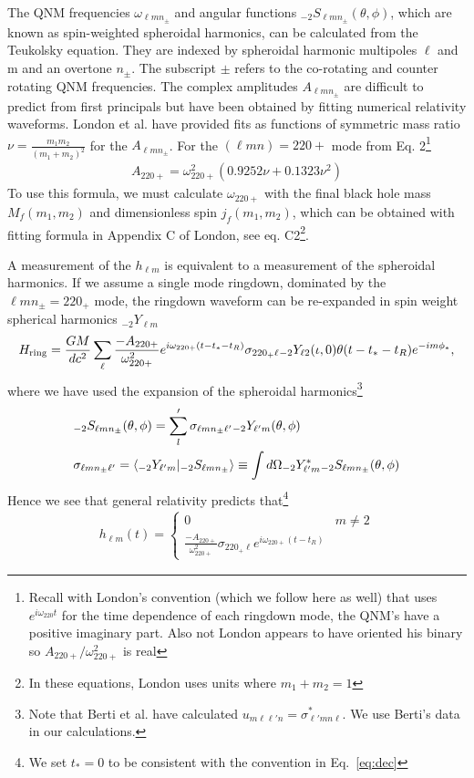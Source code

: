 \documentclass[aps,prd,amsmath,showpacs,amssymb,superscriptaddress,nofootinbib,longbibliography,eqsecnum,preprintnumbers]{revtex4-1}
\newcommand{\Sph}{{}_{-2}S_{\ell m n_{\pm}}}
\newcommand{\Ys}{{}_{-2}Y_{\ell m}}
\newcommand{\mul}{{\ell m n_{\pm}}}
\begin{document}
The QNM frequencies $\omega_\mul$ and angular functions $\Sph(\theta, \phi)$, which are known as spin-weighted spheroidal harmonics, can be calculated from the Teukolsky equation. They are indexed by spheroidal harmonic multipoles $\ell$ and m and an overtone $n_\pm$. The subscript $\pm$ refers to the co-rotating and counter rotating QNM frequencies. The complex amplitudes $A_\mul$ are difficult to predict from first principals but have been obtained by fitting numerical relativity waveforms. London et al. \cite{London:2014cma} have provided fits as functions of symmetric mass ratio $\nu=\frac{m_1m_2}{(m_1+m_2)^2}$ for the $A_{\ell m n_\pm}$. For the $(\ell m n) =220+$ mode from Eq. 2\footnote{Recall with London's convention (which we follow here as well) that uses $e^{i\omega_{220}t}$ for the time dependence of each ringdown mode, the QNM's have a positive imaginary part. Also not London appears to have oriented his binary so $A_{220+}/\omega_{220+}^2$ is real}
\begin{align}
A_{220+}=\omega_{220+}^2\left(0.9252 \nu +0.1323\nu^2 \right)
\label{eq:A220}
\end{align}
To use this formula, we must calculate $\omega_{220+}$ with the final black hole mass $M_f(m_1,m_2)$ and dimensionless spin $j_f(m_1,m_2)$, which can be obtained with fitting formula in Appendix C of London, see eq. C2\footnote{In these equations, London uses units where $m_1+m_2 =1$}.

A measurement of the $h_{\ell m}$ is equivalent to a measurement of the spheroidal harmonics.
If we assume a single mode ringdown, dominated by the $\mul=220_+$ mode, the ringdown waveform can be re-expanded in spin weight spherical harmonics $\Ys$
\begin{align}
H_{\rm ring}=\frac{GM}{dc^2}\sum_{\ell}\frac{-A_{220+}}{\omega_{220+}^2}e^{i\omega_{220+}(t-t_*-t_R)}\sigma_{220_+\ell }{}_{-2}Y_{\ell 2}(\iota,0) \theta(t-t_*-t_R)e^{-im\phi_*},
\end{align}
where we have used the expansion of the spheroidal harmonics\footnote{Note that Berti et al. \cite{Berti:2014fga} have calculated $u_{m\ell \ell'n}=\sigma_{\ell'mn\ell}^*$. We use Berti's data in our calculations.}
\begin{align}
&\Sph(\theta, \phi)=\sum_l'\sigma_{\ell m n_{\pm} \ell'}{}_{-2}Y_{\ell'm}(\theta,\phi) \nonumber \\
&\sigma_{\ell m n_\pm \ell'}=\braket{{}_{-2}Y_{\ell' m}|\Sph}\equiv \int d\Omega {}_{-2}Y^*_{\ell ' m}\Sph(\theta,\phi)
\end{align}
Hence we see that general relativity predicts that\footnote{We set $t_*=0$ to be consistent with the convention in Eq.~\eqref{eq:dec}} 
\begin{align}
h_{\ell m}(t)=
\begin{cases}
0 & m\neq 2 \\
\frac{-A_{220+}}{\omega_{220+}^2} \sigma_{220_+\ell }e^{i\omega_{220+}(t-t_R)}
\end{cases}
\end{align}
\end{document}
